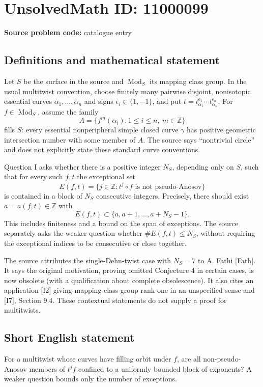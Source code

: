 \documentclass[11pt]{article}
\newcommand{\Z}{\mathbb{Z}}
\begin{document}
\section*{UnsolvedMath ID: 11000099}
\textbf{Source problem code:} catalogue entry
\subsection{Definitions and mathematical statement}
Let $S$ be the surface in the source and $\operatorname{Mod}_S$ its mapping class group. In the usual multitwist convention, choose finitely many pairwise disjoint, nonisotopic essential curves $\alpha_1,\ldots,\alpha_n$ and signs $\epsilon_i\in\{1,-1\}$, and put $t=t_{\alpha_1}^{\epsilon_1}\cdots t_{\alpha_n}^{\epsilon_n}$. For $f\in\operatorname{Mod}_S$, assume the family
\[
 A=\{f^m(\alpha_i):1\leq i\leq n,\ m\in\Z\}
\]
fills $S$: every essential nonperipheral simple closed curve $\gamma$ has positive geometric intersection number with some member of $A$. The source says ``nontrivial circle'' and does not explicitly state these standard curve conventions.

Question I asks whether there is a positive integer $N_S$, depending only on $S$, such that for every such $f,t$ the exceptional set
\[
 E(f,t)=\{j\in\Z:t^j\circ f\text{ is not pseudo-Anosov}\}
\]
is contained in a block of $N_S$ consecutive integers. Precisely, there should exist $a=a(f,t)\in\Z$ with
\[
 E(f,t)\subset\{a,a+1,\ldots,a+N_S-1\}.
\]
This includes finiteness and a bound on the span of exceptions. The source separately asks the weaker question whether $\#E(f,t)\leq N_S$, without requiring the exceptional indices to be consecutive or close together.

The source attributes the single-Dehn-twist case with $N_S=7$ to A. Fathi [Fath]. It says the original motivation, proving omitted Conjecture 4 in certain cases, is now obsolete (with a qualification about complete obsolescence). It also cites an application [I2] giving mapping-class-group rank one in an unspecified sense and [I7], Section 9.4. These contextual statements do not supply a proof for multitwists.
\subsection{Short English statement}
For a multitwist whose curves have filling orbit under $f$, are all non-pseudo-Anosov members of $t^j f$ confined to a uniformly bounded block of exponents? A weaker question bounds only the number of exceptions.
\end{document}
